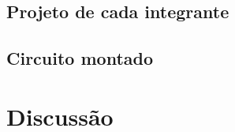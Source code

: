 \documentclass[11pt,a4paper]{article}
\begin{document}


\subsection{Projeto de cada integrante}


\subsection{Circuito montado}



\section{Discussão}


\end{document}
